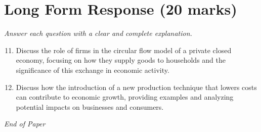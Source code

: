 \documentclass[12pt]{article}
\begin{document}
\section*{Long Form Response (20 marks)}
\textit{Answer each question with a clear and complete explanation.}
\begin{enumerate}[label=\arabic*.]
\setcounter{enumi}{10}
\item Discuss the role of firms in the circular flow model of a private closed economy, focusing on how they supply goods to households and the significance of this exchange in economic activity.
\item Discuss how the introduction of a new production technique that lowers costs can contribute to economic growth, providing examples and analyzing potential impacts on businesses and consumers.
\end{enumerate}

\vfill
\noindent\textit{End of Paper}
\end{document}
